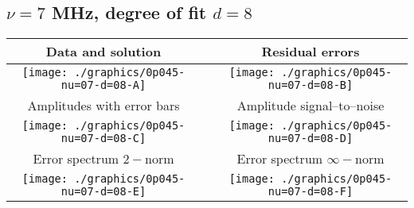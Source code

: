 

% 

\clearpage{}
\break{}

\subsection{$\nu = 7$ MHz, degree of fit $d = 8$}

\begin{table}[h]
    \begin{center}
        \begin{tabular}{ccc}
            Data and solution & \quad & Residual errors \\\hline
            \texttt{[image: ./graphics/0p045-nu=07-d=08-A]} &&
            \texttt{[image: ./graphics/0p045-nu=07-d=08-B]} \\[15pt]
            Amplitudes with error bars && Amplitude signal--to--noise \\\hline
            \texttt{[image: ./graphics/0p045-nu=07-d=08-C]} &&
            \texttt{[image: ./graphics/0p045-nu=07-d=08-D]} \\[15pt]
            Error spectrum $2-$norm && Error spectrum $\infty-$norm \\\hline
            \texttt{[image: ./graphics/0p045-nu=07-d=08-E]} &&
            \texttt{[image: ./graphics/0p045-nu=07-d=08-F]} \\[15pt]
        \end{tabular}
    \end{center}
\label{fig:elev=45, nu=7}
\end{table}



\endinput
